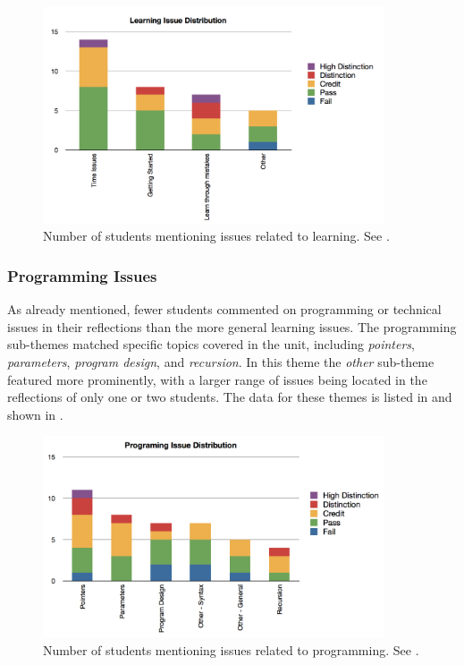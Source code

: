 
\begin{figure}[htbp]
	\centering
	\includegraphics[width=0.9\textwidth]{LearningIssues}
	\caption{Number of students mentioning issues related to learning. See .}
	\label{fig:learning_issues}
\end{figure}


\subsubsection{Programming Issues} %
\label{sub:programming_issues}

As already mentioned, fewer students commented on programming or technical issues in their reflections than the more general learning issues. The programming sub-themes matched specific topics covered in the unit, including \emph{pointers}, \emph{parameters}, \emph{program design}, and \emph{recursion}. In this theme the \emph{other} sub-theme featured more prominently, with a larger range of issues being located in the reflections of only one or two students. The data for these themes is listed in  and shown in .

\begin{figure}[htbp]
	\centering
	\includegraphics[width=0.9\textwidth]{ProgrammingIssues}
	\caption{Number of students mentioning issues related to programming. See .}
	\label{fig:programming_issues}
\end{figure}

